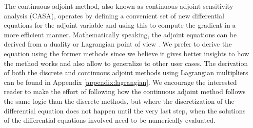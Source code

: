 The continuous adjoint method, also known as continuous adjoint sensitivity analysis (CASA), operates by defining a convenient set of new differential equations for the adjoint variable and using this to compute the gradient in a more efficient manner. 
Mathematically speaking, the adjoint equations can be derived from a duality or Lagrangian point of view \cite{Giles_Pierce_2000}.
We prefer to derive the equation using the former methods since we believe it gives better insights to how the method works and also allow to generalize to other user cases. 
The derivation of both the discrete and continuous adjoint methods using Lagrangian multipliers can be found in Appendix \ref{appendix:lagrangian}.
We encourage the interested reader to make the effort of following how the continuous adjoint method follows the same logic than the discrete methods, but where the discretization of the differential equation does not happen until the very last step, when the solutions of the differential equations involved need to be numerically evaluated. 

